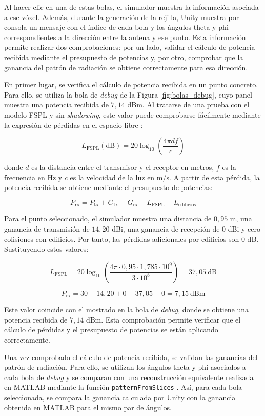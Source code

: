 Al hacer clic en una de estas bolas, el simulador muestra la información asociada a ese vóxel. Además, durante la generación de la rejilla, Unity muestra por consola un mensaje con el índice de cada bola y los ángulos theta y phi correspondientes a la dirección entre la antena y ese punto. Esta información permite realizar dos comprobaciones: por un lado, validar el cálculo de potencia recibida mediante el presupuesto de potencias y, por otro, comprobar que la ganancia del patrón de radiación se obtiene correctamente para esa dirección.

En primer lugar, se verifica el cálculo de potencia recibida en un punto concreto. Para ello, se utiliza la bola de \textit{debug} de la Figura \ref{fig:bolas_debug}, cuyo panel muestra una potencia recibida de $7,14$ dBm. Al tratarse de una prueba con el modelo FSPL y sin \textit{shadowing}, este valor puede comprobarse fácilmente mediante la expresión de pérdidas en el espacio libre \cite{itur_p341}:

\[
L_{\mathrm{FSPL}}(\mathrm{dB}) = 20 \log_{10}\left(\frac{4 \pi d f}{c}\right)
\]


donde $d$ es la distancia entre el transmisor y el receptor en metros, $f$ es la frecuencia en Hz y $c$ es la velocidad de la luz en m/s. A partir de esta pérdida, la potencia recibida se obtiene mediante el presupuesto de potencias:

\[
P_{\mathrm{rx}} = P_{\mathrm{tx}} + G_{\mathrm{tx}} + G_{\mathrm{rx}} - L_{\mathrm{FSPL}} - L_{\mathrm{edificios}}
\]

Para el punto seleccionado, el simulador muestra una distancia de $0,95$ m, una ganancia de transmisión de $14,20$ dBi, una ganancia de recepción de $0$ dBi y cero colisiones con edificios. Por tanto, las pérdidas adicionales por edificios son $0$ dB. Sustituyendo estos valores:

\[
L_{\mathrm{FSPL}} = 20 \log_{10}\left(\frac{4 \pi \cdot 0,95 \cdot 1,785 \cdot 10^9}{3 \cdot 10^8}\right) = 37,05\ \mathrm{dB}
\]

\[
P_{\mathrm{rx}} = 30 + 14,20 + 0 - 37,05 - 0 = 7,15\ \mathrm{dBm}
\]

Este valor coincide con el mostrado en la bola de \textit{debug}, donde se obtiene una potencia recibida de $7,14$ dBm. Esta comprobación permite verificar que el cálculo de pérdidas y el presupuesto de potencias se están aplicando correctamente.

Una vez comprobado el cálculo de potencia recibida, se validan las ganancias del patrón de radiación. Para ello, se utilizan los ángulos theta y phi asociados a cada bola de \textit{debug} y se comparan con una reconstrucción equivalente realizada en MATLAB mediante la función \texttt{patternFromSlices} \cite{mathworks_patternfromslices}. Así, para cada bola seleccionada, se compara la ganancia calculada por Unity con la ganancia obtenida en MATLAB para el mismo par de ángulos.

